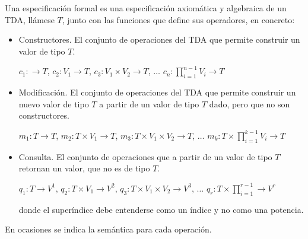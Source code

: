 Una especificación formal es una especificación axiomática y algebraica de un TDA, llámese $T$, junto con las funciones que define sus operadores, en concreto:
\begin{itemize}
\item Constructores. El conjunto de operaciones del TDA que permite construir un  valor de tipo $T$.

\centerline{$c_1:\longrightarrow T$,  \hphantom{MM}
$c_2:V_1\longrightarrow T$,  \hphantom{MM}
$c_3:V_1\times V_2 \longrightarrow T$,  \hphantom{MM} $\ldots$ \hphantom{MM}
$c_n:\displaystyle \prod_{i=1}^{n-1} V_i\longrightarrow T$}

\item Modificación. El conjunto de operaciones del TDA que permite construir un nuevo valor de tipo $T$ a partir de un valor de tipo $T$ dado, pero que no son constructores.

\centerline{$m_1:  T \longrightarrow T$,  \hphantom{l}
$m_2: T\times V_1\longrightarrow T$,  \hphantom{l}
$m_3: T\times V_1\times V_2 \longrightarrow T$,   $\ldots$
$m_k:\displaystyle T\times \prod_{i=1}^{k-1} V_i\longrightarrow T$}




\item Consulta. El conjunto de operaciones que a partir de un valor de tipo $T$ retornan un valor, que no es de tipo $T$.

\centerline{$q_1:  T \longrightarrow V^{1}$,  \hphantom{l}
$q_2: T \times V_1 \longrightarrow  V^{2}$,  \hphantom{l}
$q_3: T \times V_1 \times V_2 \longrightarrow   V^{3}$,   $\ldots$
$q_r:\displaystyle T \times \prod_{i=1}^{r-1} \longrightarrow   V^{r}$}
donde el superíndice debe entenderse como un índice y no como una potencia.
\end{itemize}
En ocasiones se indica la semántica para cada operación.




